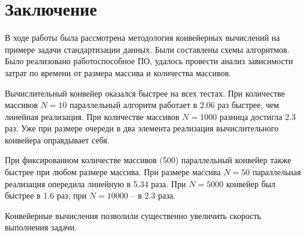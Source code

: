 \chapter{Заключение}
В ходе работы была рассмотрена методология конвейерных вычислений на примере задачи стандартизации данных.
Были составлены схемы алгоритмов.
Было реализовано работоспособное ПО, удалось провести анализ зависимости затрат по времени от размера массива и количества массивов.

Вычислительный конвейер оказался быстрее на всех тестах.
При количестве массивов $ N = 10 $ параллельный алгоритм работает в 2.06 раз быстрее, чем линейная реализация.
При количестве массивов $ N = 1000 $ разница достигла 2.3 раз.
Уже при размере очереди в два элемента реализация вычислительного конвейера оправдывает себя.

При фиксированном количестве массивов (500) параллельный конвейер также быстрее при любом размере массива.
При размере массива $ N = 50 $ параллельная реализация опередила линейную в 5.34 раза. 
При $ N = 5000 $ конвейер был быстрее в 1.6 раз, при $ N = 10000 $ --  в 2.3 раза.

Конвейерные вычисления позволили существенно увеличить скорость выполнения задачи.